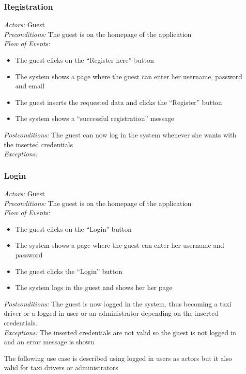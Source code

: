 \documentclass{article}
\begin{document}
\subsubsection{Registration}
\textit{Actors:} Guest
\\\textit{Preconditions:} The guest is on the homepage of the application
\\\textit{Flow of Events:}
\begin{itemize}
	\item  The guest clicks on the ``Register here'' button
	\item  The system shows a page where the guest can enter her username, password and email
	\item  The guest inserts the requested data and clicks the ``Register'' button
	\item  The system shows a ``successful registration'' message 
\end{itemize}
\textit{Postconditions:} The guest can now log in the system whenever she wants with the inserted credentials
\\\textit{Exceptions:}

\subsubsection{Login}
\textit{Actors:} Guest
\\\textit{Preconditions:} The guest is on the homepage of the application
\\\textit{Flow of Events:}
\begin{itemize}
	\item  The guest clicks on the ``Login'' button
	\item  The system shows a page where the guest can enter her username and password
	\item  The guest clicks the ``Login'' button
	\item  The system logs in the guest and shows her her page
\end{itemize}
\textit{Postconditions:} The guest is now logged in the system, thus becoming a taxi driver or a logged in user or an administrator depending on the inserted credentials.
\\\textit{Exceptions:} The inserted credentials are not valid so the guest is not logged in and an error message is shown

The following use case is described using logged in users as actors but it also valid for taxi drivers or administrators
\end{document}
